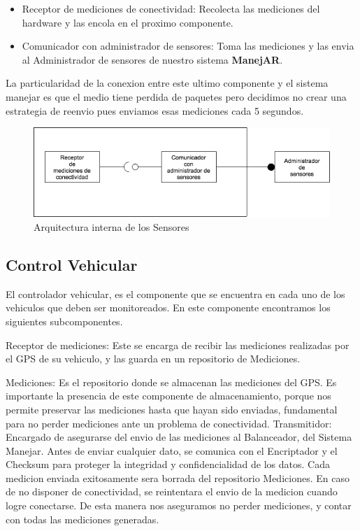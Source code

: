 \begin{itemize}
  \item Receptor de mediciones de conectividad: Recolecta las mediciones del 
  hardware y las encola en el proximo componente.
  
  \item Comunicador con administrador de sensores: Toma las mediciones y las 
  envia al Administrador de sensores de nuestro sistema \textbf{ManejAR}.
\end{itemize}



La particularidad de la conexion entre este ultimo componente y el sistema 
manejar es que el medio tiene perdida de paquetes pero decidimos no crear una 
estrategia de reenvio pues enviamos esas mediciones cada 5 segundos.


\begin{figure}
\centerline{\includegraphics[width=1\textwidth]{./imagenes/arquitectura_tp2/sensor.png}}
\caption{Arquitectura interna de los Sensores}
\end{figure}

\subsection{Control Vehicular}
El controlador vehicular, es el componente que se encuentra en cada uno de los vehiculos que deben
ser monitoreados. En este componente encontramos los siguientes subcomponentes.

Receptor de mediciones: Este se encarga de recibir las mediciones realizadas por el GPS de su vehiculo,
 y las guarda en un repositorio de Mediciones.
 
Mediciones: Es el repositorio donde se almacenan las mediciones del GPS.
 Es importante la presencia de este componente de almacenamiento, porque nos permite preservar
las mediciones hasta que hayan sido enviadas, fundamental para no perder mediciones ante un
 problema de conectividad.
Transmitidor: Encargado de asegurarse del envio de las mediciones al Balanceador, del Sistema Manejar.
Antes de enviar cualquier dato, se comunica con el Encriptador y el Checksum para proteger la
integridad y confidencialidad de los datos. Cada medicion enviada exitosamente sera borrada del
repositorio Mediciones. En caso de no disponer de conectividad, se reintentara el envio de la medicion
cuando logre conectarse. De esta manera nos aseguramos no perder mediciones, y
 contar con todas las mediciones generadas.

